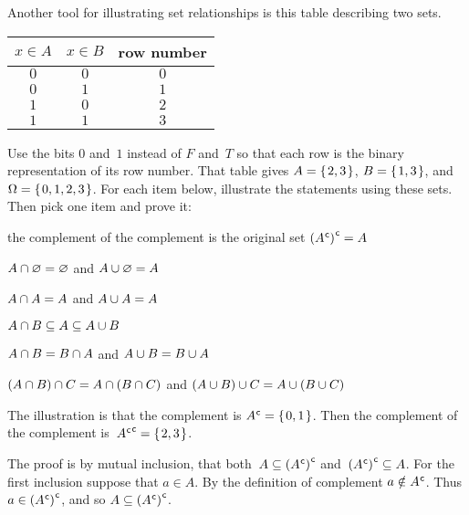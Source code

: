\documentclass{test}  %
\begin{document}
\begin{problem}
Another tool for illustrating set relationships is this table describing 
two sets.
\begin{center} \small
  \begin{tabular}{cc|c}
    $x\in A$  &$x\in B$  &row number \\ \hline
    $0$       &$0$       &$0$  \\
    $0$       &$1$       &$1$  \\
    $1$       &$0$       &$2$  \\
    $1$       &$1$       &$3$  
  \end{tabular}
\end{center}
Use the bits $0$ and~$1$ instead of $F$ and~$T$ so that each
row is the binary representation of its row number.
That table gives $A=\mbox{$\{\hspace{0.1em}2,3\hspace{0.1em}\}$}$, $B=\mbox{$\{\hspace{0.1em}1,3\hspace{0.1em}\}$}$, 
and~$\Omega=\mbox{$\{\hspace{0.1em}0,1,2,3\hspace{0.1em}\}$}$.
For each item below, illustrate the statements using these sets.
Then pick one item and prove it:
\begin{items}
\item the complement of the complement is the original set
  ${({A}^{\mspace{1mu}\mathsf{c}})}^{\mspace{1mu}\mathsf{c}}=A$  
\item $A\cap\varnothing=\varnothing$ and $A\cup\varnothing=A$  
\item {} $A\cap A=A$ and $A\cup A=A$    
\item $A\cap B\subseteq A\subseteq A\cup B$  
\item {}
   $A\cap B=B\cap A$ and
   $A\cup B=B\cup A$ 
\item {} 
  $(A\cap B)\cap C=A\cap (B\cap C)$
  and
  $(A\cup B)\cup C=A\cup (B\cup C)$ 
\end{items}
\begin{answer}
\begin{items}
\item  The illustration is that the complement is 
  ${A}^{\mspace{1mu}\mathsf{c}}=\mbox{$\{\hspace{0.1em}0,1\hspace{0.1em}\}$}$.
  Then the complement of the complement is~${{A}^{\mspace{1mu}\mathsf{c}}}^{\mspace{1mu}\mathsf{c}}=\mbox{$\{\hspace{0.1em}2,3\hspace{0.1em}\}$}$.
  
  The proof 
  is by mutual inclusion, that both~$A\subseteq{({A}^{\mspace{1mu}\mathsf{c}})}^{\mspace{1mu}\mathsf{c}}$
  and~${({A}^{\mspace{1mu}\mathsf{c}})}^{\mspace{1mu}\mathsf{c}}\subseteq A$.
  For the first inclusion suppose that $a\in A$.
  By the definition of complement $a\notin{A}^{\mspace{1mu}\mathsf{c}}$.
  Thus $a\in{({A}^{\mspace{1mu}\mathsf{c}})}^{\mspace{1mu}\mathsf{c}}$,
  and so $A\subseteq{({A}^{\mspace{1mu}\mathsf{c}})}^{\mspace{1mu}\mathsf{c}}$.


\end{items}
\end{answer}
\end{problem}
\end{document}

